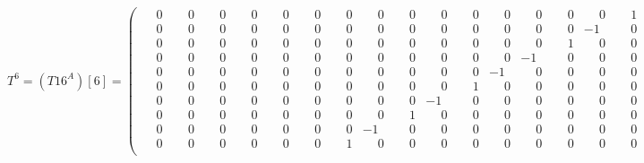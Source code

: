 \documentclass[10pt]{article}
\begin{document}
\[
T^{6} = (T16^A)[6] = \left(\begin{smallmatrix}
\phantom{-}0 & \phantom{-}0 & \phantom{-}0 & \phantom{-}0 & \phantom{-}0 & \phantom{-}0 & \phantom{-}0 & \phantom{-}0 & \phantom{-}0 & \phantom{-}0 & \phantom{-}0 & \phantom{-}0 & \phantom{-}0 & \phantom{-}0 & \phantom{-}0 & \phantom{-}1 \\
\phantom{-}0 & \phantom{-}0 & \phantom{-}0 & \phantom{-}0 & \phantom{-}0 & \phantom{-}0 & \phantom{-}0 & \phantom{-}0 & \phantom{-}0 & \phantom{-}0 & \phantom{-}0 & \phantom{-}0 & \phantom{-}0 & \phantom{-}0 & -1 & \phantom{-}0 \\
\phantom{-}0 & \phantom{-}0 & \phantom{-}0 & \phantom{-}0 & \phantom{-}0 & \phantom{-}0 & \phantom{-}0 & \phantom{-}0 & \phantom{-}0 & \phantom{-}0 & \phantom{-}0 & \phantom{-}0 & \phantom{-}0 & \phantom{-}1 & \phantom{-}0 & \phantom{-}0 \\
\phantom{-}0 & \phantom{-}0 & \phantom{-}0 & \phantom{-}0 & \phantom{-}0 & \phantom{-}0 & \phantom{-}0 & \phantom{-}0 & \phantom{-}0 & \phantom{-}0 & \phantom{-}0 & \phantom{-}0 & -1 & \phantom{-}0 & \phantom{-}0 & \phantom{-}0 \\
\phantom{-}0 & \phantom{-}0 & \phantom{-}0 & \phantom{-}0 & \phantom{-}0 & \phantom{-}0 & \phantom{-}0 & \phantom{-}0 & \phantom{-}0 & \phantom{-}0 & \phantom{-}0 & -1 & \phantom{-}0 & \phantom{-}0 & \phantom{-}0 & \phantom{-}0 \\
\phantom{-}0 & \phantom{-}0 & \phantom{-}0 & \phantom{-}0 & \phantom{-}0 & \phantom{-}0 & \phantom{-}0 & \phantom{-}0 & \phantom{-}0 & \phantom{-}0 & \phantom{-}1 & \phantom{-}0 & \phantom{-}0 & \phantom{-}0 & \phantom{-}0 & \phantom{-}0 \\
\phantom{-}0 & \phantom{-}0 & \phantom{-}0 & \phantom{-}0 & \phantom{-}0 & \phantom{-}0 & \phantom{-}0 & \phantom{-}0 & \phantom{-}0 & -1 & \phantom{-}0 & \phantom{-}0 & \phantom{-}0 & \phantom{-}0 & \phantom{-}0 & \phantom{-}0 \\
\phantom{-}0 & \phantom{-}0 & \phantom{-}0 & \phantom{-}0 & \phantom{-}0 & \phantom{-}0 & \phantom{-}0 & \phantom{-}0 & \phantom{-}1 & \phantom{-}0 & \phantom{-}0 & \phantom{-}0 & \phantom{-}0 & \phantom{-}0 & \phantom{-}0 & \phantom{-}0 \\
\phantom{-}0 & \phantom{-}0 & \phantom{-}0 & \phantom{-}0 & \phantom{-}0 & \phantom{-}0 & \phantom{-}0 & -1 & \phantom{-}0 & \phantom{-}0 & \phantom{-}0 & \phantom{-}0 & \phantom{-}0 & \phantom{-}0 & \phantom{-}0 & \phantom{-}0 \\
\phantom{-}0 & \phantom{-}0 & \phantom{-}0 & \phantom{-}0 & \phantom{-}0 & \phantom{-}0 & \phantom{-}1 & \phantom{-}0 & \phantom{-}0 & \phantom{-}0 & \phantom{-}0 & \phantom{-}0 & \phantom{-}0 & \phantom{-}0 & \phantom{-}0 & \phantom{-}0 \\

\end{smallmatrix}\]
\end{document}
